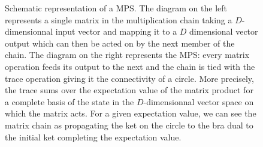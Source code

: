 \documentclass[10pt, a4paper]{article}
\begin{document}
{\begin{enumerate}
\begin{figure}
    \caption{Schematic representation of a MPS. The diagram on the left represents a single matrix in the multiplication chain taking a $D$-dimensionnal input vector and mapping it to a $D$ dimensional vector output which can then be acted on by the next member of the chain. The diagram on the right represents the MPS: every matrix operation feeds its output to the next and the chain is tied with the trace operation giving it the connectivity of a circle. More precisely, the trace sums over the expectation value of the matrix product for a complete basis of the state in the $D$-dimensionnal vector space on which the matrix acts. For a given expectation value, we can see the matrix chain as propagating the ket on the circle to the bra dual to the initial ket completing the expectation value. \label{MPS}}
  \end{figure}
  

\end{enumerate}}
\end{document}
